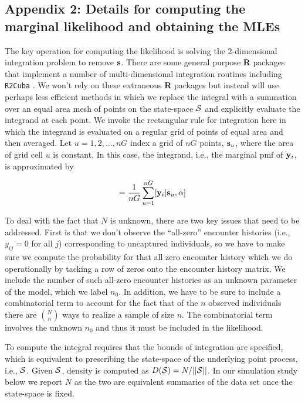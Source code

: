 \documentclass[12pt]{article}
\begin{document}
\begin{spacing}{1.2}
\section*{Appendix 2: Details for computing the marginal likelihood
  and obtaining the MLEs}


The key operation for computing the likelihood is solving the
2-dimensional integration problem to remove ${\bf s}$. There are some
general purpose {\bf R} packages that implement a number of
multi-dimensional integration routines including 
\mbox{\tt R2Cuba} \citep{hahn_etal:2011}.
We won't rely on these extraneous {\bf R} packages but instead will
use perhaps less efficient methods in which we replace the integral
with a summation over an equal area mesh of points on the state-space
${\cal S}$ and explicitly evaluate the integrand at each point. We
invoke the rectangular rule for integration here in which the
integrand is evaluated on a regular grid of points of equal area and
then averaged.  Let $u=1,2,\ldots,nG$ index a grid of $nG$ points,
${\bf s}_{u}$, where the area of grid cell $u$ is constant.  In this
case, the integrand, i.e., the marginal pmf of ${\bf y}_{i}$, is
approximated by

\begin{equation}
         [{\bf y}_{i}|\alpha] = \frac{1}{nG} \sum_{u=1}^{nG}  [ {\bf
            y}_{i} |{\bf s}_u, \alpha]
\label{mle.eq.intlik}
\end{equation}

To deal with the fact that $N$ is unknown, there are two key issues
that need to be addressed.  First is that we don't observe the
``all-zero'' encounter histories (i.e., $y_{ij} = 0$ for all $j$)
corresponding to uncaptured individuals, so we have to make sure we
compute the probability for that all zero encounter history which we
do operationally by tacking a row of zeros onto the encounter history
matrix. We include the number of such all-zero encounter histories as
an unknown parameter of the model, which we label $n_{0}$.  In
addition, we have to be sure to include a combinatorial term to
account for the fact that of the $n$ observed individuals there are
${N \choose n}$ ways to realize a sample of size $n$. The
combinatorial term involves the unknown $n_{0}$ and thus it must be
included in the likelihood.

To compute the integral requires that the bounds of integration are
specified, which is equivalent to prescribing the state-space of the
underlying point process, i.e., ${\cal S}$. Given ${\cal S}$, density
is
computed as $D({\cal S}) = N/||{\cal S}||$. In our simulation study
below we report $N$ as the two are equivalent summaries of the data
set once the state-space is fixed.


\end{spacing}
\end{document}
